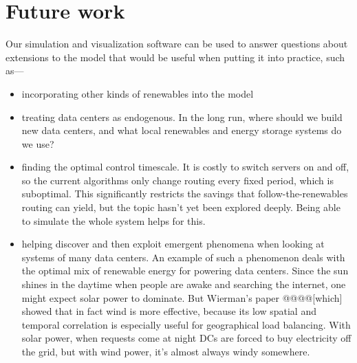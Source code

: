 \documentclass{acm_proc_article-sp}
\begin{document}
\section{Future work}
Our simulation and visualization software can be used to answer questions about extensions to the model that would be useful when putting it into practice, such as—
\begin{itemize}
\item incorporating other kinds of renewables into the model
\item treating data centers as endogenous. In the long run, where should we build new data centers, and what local renewables and energy storage systems do we use?
\item finding the optimal control timescale. It is costly to switch servers on and off, so the current algorithms only change routing every fixed period, which is suboptimal. This significantly restricts the savings that follow-the-renewables routing can yield, but the topic hasn’t yet been explored deeply. Being able to simulate the whole system helps for this.
\item helping discover and then exploit emergent phenomena when looking at systems of many data centers. An example of such a phenomenon deals with the optimal mix of renewable energy for powering data centers. Since the sun shines in the daytime when people are awake and searching the internet, one might expect solar power to dominate. But Wierman’s paper @@@@[which] showed that in fact wind is more effective, because its low spatial and temporal correlation is especially useful for geographical load balancing. With solar power, when requests come at night DCs are forced to buy electricity off the grid, but with wind power, it’s almost always windy somewhere.
\end{itemize}



\end{document}
